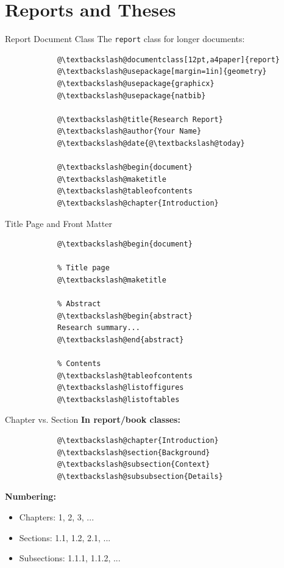 \documentclass[aspectratio=169]{beamer}
\begin{document}
	\section{Reports and Theses}
	
	\begin{frame}[fragile]{Report Document Class}
		The \texttt{report} class for longer documents:
		
		\begin{lstlisting}
			@\textbackslash@documentclass[12pt,a4paper]{report}
			@\textbackslash@usepackage[margin=1in]{geometry}
			@\textbackslash@usepackage{graphicx}
			@\textbackslash@usepackage{natbib}
			
			@\textbackslash@title{Research Report}
			@\textbackslash@author{Your Name}
			@\textbackslash@date{@\textbackslash@today}
			
			@\textbackslash@begin{document}
			@\textbackslash@maketitle
			@\textbackslash@tableofcontents
			@\textbackslash@chapter{Introduction}
		\end{lstlisting}
	\end{frame}
	
	\begin{frame}[fragile]{Title Page and Front Matter}
		\begin{lstlisting}
			@\textbackslash@begin{document}
			
			% Title page
			@\textbackslash@maketitle
			
			% Abstract
			@\textbackslash@begin{abstract}
			Research summary...
			@\textbackslash@end{abstract}
			
			% Contents
			@\textbackslash@tableofcontents
			@\textbackslash@listoffigures
			@\textbackslash@listoftables
		\end{lstlisting}
	\end{frame}
	
	\begin{frame}[fragile]{Chapter vs. Section}
		\textbf{In report/book classes:}
		
		\begin{lstlisting}
			@\textbackslash@chapter{Introduction}
			@\textbackslash@section{Background}
			@\textbackslash@subsection{Context}
			@\textbackslash@subsubsection{Details}
		\end{lstlisting}
		
		\vspace{1em}
		
		\textbf{Numbering:}
		\begin{itemize}
			\item Chapters: 1, 2, 3, ...
			\item Sections: 1.1, 1.2, 2.1, ...
			\item Subsections: 1.1.1, 1.1.2, ...
		\end{itemize}
	\end{frame}
	
\end{document}
